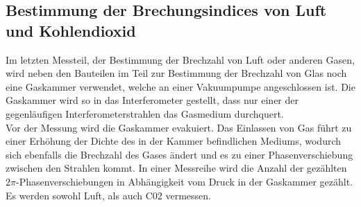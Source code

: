 \subsection{Bestimmung der Brechungsindices von Luft und Kohlendioxid}
%
Im letzten Messteil, der Bestimmung der Brechzahl von Luft oder 
anderen Gasen, wird neben den Bauteilen im Teil zur Bestimmung 
der Brechzahl von Glas noch eine Gaskammer verwendet, welche 
an einer Vakuumpumpe angeschlossen ist. Die Gaskammer wird so 
in das Interferometer gestellt, dass nur einer der gegenläufigen 
Interferometerstrahlen das Gasmedium durchquert.\\
Vor der Messung wird die Gaskammer evakuiert. Das Einlassen von 
Gas führt zu einer Erhöhung der Dichte des in der Kammer befindlichen 
Mediums, wodurch sich ebenfalls die Brechzahl des Gases ändert und es 
zu einer Phasenverschiebung zwischen den Strahlen kommt.
In einer Messreihe wird die Anzahl der gezählten 
$2\pi$-Phasenverschiebungen in Abhängigkeit vom Druck in der 
Gaskammer gezählt.\\
Es werden sowohl Luft, als auch C02 vermessen.
%
